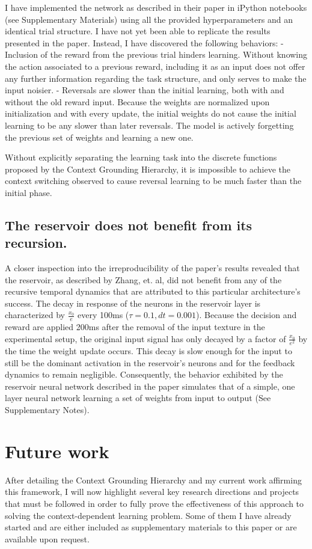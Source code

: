 \documentclass[11pt]{article}
\begin{document}
I have implemented the network as described in their paper in iPython notebooks (see Supplementary Materials) using all the provided hyperparameters and an identical trial structure.  I have not yet been able to replicate the results presented in the paper.  Instead, I have discovered the following behaviors:
- Inclusion of the reward from the previous trial hinders learning.  Without knowing the action associated to a previous reward, including it as an input does not offer any further information regarding the task structure, and only serves to make the input noisier.
- Reversals are slower than the initial learning, both with and without the old reward input.  Because the weights are normalized upon initialization and with every update, the initial weights do not cause the initial learning to be any slower than later reversals.  The model is actively forgetting the previous set of weights and learning a new one.

Without explicitly separating the learning task into the discrete functions proposed by the Context Grounding Hierarchy, it is impossible to achieve the context switching observed to cause reversal learning to be much faster than the initial phase.

\subsection{The reservoir does not benefit from its recursion.}
A closer inspection into the irreproducibility of the paper's results revealed that the reservoir, as described by Zhang, et. al, did not benefit from any of the recursive temporal dynamics that are attributed to this particular architecture's success.  The decay in response of the neurons in the reservoir layer is characterized by $\frac{x_0}{e}$ every 100ms ($\tau=0.1, dt=0.001$).  Because the decision and reward are applied 200ms after the removal of the input texture in the experimental setup, the original input signal has only decayed by a factor of $\frac{x_0}{e^2}$ by the time the weight update occurs.  This decay is slow enough for the input to still be the dominant activation in the reservoir's neurons and for the feedback dynamics to remain negligible.  Consequently, the behavior exhibited by the reservoir neural network described in the paper simulates that of a simple, one layer neural network learning a set of weights from input to output (See Supplementary Notes).



\section{Future work}
After detailing the Context Grounding Hierarchy and my current work affirming this framework, I will now highlight several key research directions and projects that must be followed in order to fully prove the effectiveness of this approach to solving the context-dependent learning problem.  Some of them I have already started and are either included as supplementary materials to this paper or are available upon request.
\end{document}
